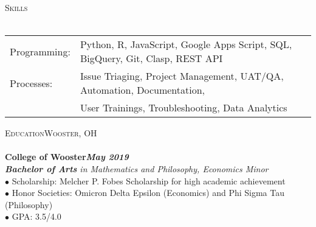 \documentclass[a4paper]{article}
\newcommand{\lineunder} {
    \vspace*{-8pt} \\
    \hspace*{-18pt} \hrulefill \\
}
\newcommand{\header} [1] {
    {\hspace*{-18pt}\vspace*{6pt} \textsc{#1}}
    \vspace*{-6pt} \lineunder
}
\begin{document}
\header{Skills}
\begin{tabular}[leftmargin=-10pt,align=left]{ l l }
	\hspace*{-16pt}Programming:    &   Python, R, JavaScript, Google Apps Script, SQL, BigQuery, Git, Clasp, REST API\\
    \hspace*{-16pt}Processes:      &   Issue Triaging, Project Management, UAT/QA, Automation, Documentation,\\
                    &   User Trainings, Troubleshooting, Data Analytics
\end{tabular}
\vspace{2mm}

\header{Education\hfill Wooster, OH}
\hspace{-16pt}\textbf{College of Wooster}\hfill\textbf{\textit{May 2019}}\\
\hspace{-16pt}\textit{\textbf{Bachelor of Arts} in Mathematics and Philosophy, Economics Minor}\\
\hspace*{-12pt}$\bullet$ Scholarship: Melcher P. Fobes Scholarship for high academic achievement\\
\hspace*{-12pt}$\bullet$ Honor Societies: Omicron Delta Epsilon (Economics) and Phi Sigma Tau (Philosophy)\\
\hspace*{-12pt}$\bullet$ GPA: 3.5/4.0
\vspace*{2mm}
\end{document}
